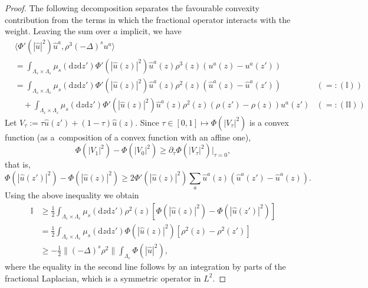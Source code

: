 \documentclass{article}
\numberwithin{equation}{section}
\newcommand{\assign}{:=}
\newcommand{\backassign}{=:}
\newcommand{\mathd}{\mathrm{d}}
\theoremstyle{plain}
\theoremstyle{definition}
\begin{document}
\begin{proof}
  The following decomposition separates the favourable convexity contribution
  from the terms in which the fractional operator interacts with the weight.
  Leaving the sum over $a$ implicit, we have
  \[ \begin{aligned}
       &  \langle \Phi' (| \hat{u} |^2)  \hat{u}^a,
       \rho^3 (- \Delta)^s u^a \rangle \\
       & =  \int_{\Lambda_{\varepsilon}\times\Lambda_{\varepsilon}} \mu_s (\mathd z \mathd z') \Phi' (|
       \hat{u} (z) |^2)  \hat{u}^a (z) \rho^3 (z)  (u^a (z) - u^a (z')) \\
       & =  \int_{\Lambda_{\varepsilon}\times\Lambda_{\varepsilon}} \mu_s (\mathd z \mathd z') \Phi' (|
       \hat{u} (z) |^2)  \hat{u}^a (z) \rho^2 (z)  (\hat{u}^a (z) - \hat{u}^a
       (z')) & (\backassign (\mathbb{I}))\\
       & \quad  + \int_{\Lambda_{\varepsilon}\times\Lambda_{\varepsilon}} \mu_s (\mathd z \mathd z') \Phi'
       (| \hat{u} (z) |^2)  \hat{u}^a (z) \rho^2 (z)  (\rho (z') - \rho (z))
       u^a (z') & (\backassign (\mathbb{I}\mathbb{I}))
     \end{aligned} \]
  Let $V_{\tau} \assign \tau \hat{u} (z') + (1 - \tau)  \hat{u} (z)$. Since
  $\tau \in [0, 1] \mapsto \Phi (| V_{\tau} |^2)$ is a convex function (as a~composition of a convex function with an affine one),
  \[ \Phi (| V_1 |^2) - \Phi (| V_0 |^2) \geqslant \partial_{\tau}
     \Phi (| V_{\tau} |^2) |_{\tau = 0}, \]
  that is,
  \[ \Phi (| \hat{u} (z') |^2) - \Phi (| \hat{u} (z) |^2) \geqslant 2 \Phi' (|
     \hat{u} (z) |^2)  \sum_a \hat{u}^a (z)  (\hat{u}^a (z') - \hat{u}^a (z))
     . \]
  Using the above inequality we obtain
  \[ \begin{aligned}
       \mathbb{I} & \geqslant  \frac{1}{2} \int_{\Lambda_{\varepsilon} \times
       \Lambda_{\varepsilon}} \mu_s (\mathd z \mathd z') \rho^2 (z)  [\Phi (|
       \hat{u} (z) |^2) - \Phi (| \hat{u} (z') |^2)]\\
       & =  \frac{1}{2} \int_{\Lambda_{\varepsilon} \times
       \Lambda_{\varepsilon}} \mu_s (\mathd z \mathd z') \Phi (| \hat{u} (z)
       |^2)  [\rho^2 (z) - \rho^2 (z')]\\
       & \geqslant  - \frac{1}{2} \| (- \Delta)^s \rho^2 \|
       \int_{\Lambda_{\varepsilon}} \Phi (| \hat{u} |^2),
     \end{aligned} \]
  where the equality in the second line follows by an integration by parts of
  the fractional Laplacian, which is a symmetric operator in $L^2$.

\end{proof}
\end{document}
